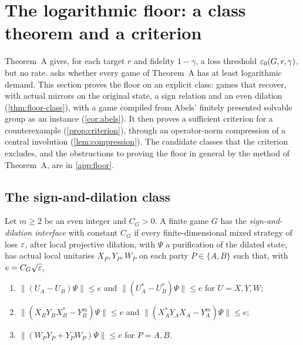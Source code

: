 \section{The logarithmic floor: a class theorem and a criterion}\label{sec:floor}

Theorem~A gives, for each target $r$ and fidelity $1-\gamma$, a loss threshold $\varepsilon_0(G,r,\gamma)$, but no rate.
 asks whether every game of Theorem~A has at least logarithmic demand. This section proves the floor on an
explicit class: games that recover, with actual mirrors on the original state, a sign relation and an even dilation
(\cref{thm:floor-class}), with a game compiled from Abels' finitely presented solvable group as an instance (\cref{cor:abels}).
It then proves a sufficient criterion for a counterexample (\cref{prop:criterion}), through an operator-norm compression of a
central involution (\cref{lem:compression}). The candidate classes that the criterion excludes, and the
obstructions to proving the floor in general by the method of Theorem~A, are in \cref{app:floor}.

\subsection{The sign-and-dilation class}\label{sec:floor-class}

\begin{definition}\label{def:sign-dilation}
Let $m\ge2$ be an even integer and $C_G>0$. A finite game $G$ has the \emph{sign-and-dilation interface} with constant $C_G$ if
every finite-dimensional mixed strategy of loss $\varepsilon$, after local projective dilation, with $\Psi$ a purification of the
dilated state, has actual local unitaries $X_P,Y_P,W_P$ on each party $P\in\{A,B\}$ such that, with $e=C_G\sqrt{\varepsilon}$,
\begin{enumerate}[label=(I\arabic*),itemsep=1pt]
\item\label{I1} $\|(U_A-U_B)\Psi\|\le e$ and $\|(U_A^*-U_B^*)\Psi\|\le e$ for $U=X,Y,W$;
\item\label{I2} $\|(X_BY_BX_B^*-Y_B^m)\Psi\|\le e$ and $\|(X_A^*Y_AX_A-Y_A^m)\Psi\|\le e$;
\item\label{I3} $\|(W_PY_P+Y_PW_P)\Psi\|\le e$ for $P=A,B$.
\end{enumerate}
\end{definition}

